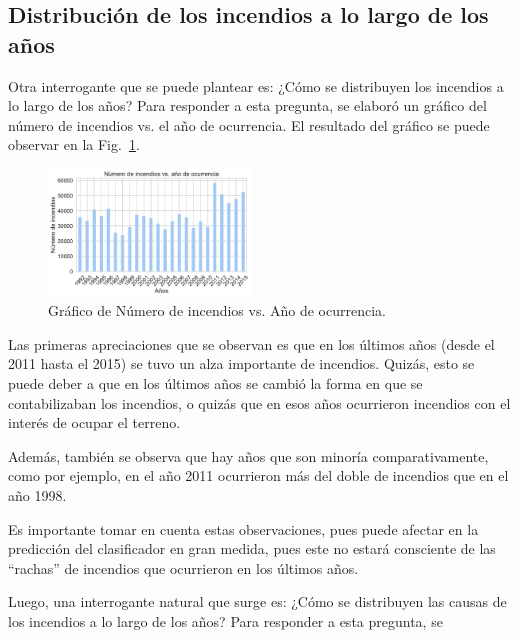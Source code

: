 \subsection{Distribución de los incendios a lo largo de los años}
Otra interrogante que se puede plantear es: ¿Cómo se distribuyen los incendios a lo largo de los años? Para responder a esta pregunta, se elaboró un gráfico del número de incendios vs. el año de ocurrencia. El resultado del gráfico se puede observar en la Fig.~\ref{fig:Year-Ocurr}.
\begin{figure}
    \centering
    \includegraphics[width=0.48\textwidth]{imagenes/YEAR_OCURRENCIA.pdf}
    \caption{Gráfico de Número de incendios vs. Año de ocurrencia.}
    \label{fig:Year-Ocurr}
\end{figure}

Las primeras apreciaciones que se observan es que en los últimos años (desde el 2011 hasta el 2015) se tuvo un alza importante de incendios. Quizás, esto se puede deber a que en los últimos años se cambió la forma en que se contabilizaban los incendios, o quizás que en esos años ocurrieron incendios con el interés de ocupar el terreno.

Además, también se observa que hay años que son minoría comparativamente, como por ejemplo, en el año 2011 ocurrieron más del doble de incendios que en el año 1998. 

Es importante tomar en cuenta estas observaciones, pues puede afectar en la predicción del clasificador en gran medida, pues este no estará consciente de las ``rachas'' de incendios que ocurrieron en los últimos años.

Luego, una interrogante natural que surge es: ¿Cómo se distribuyen las causas de los incendios a lo largo de los años? Para responder a esta pregunta, se 











